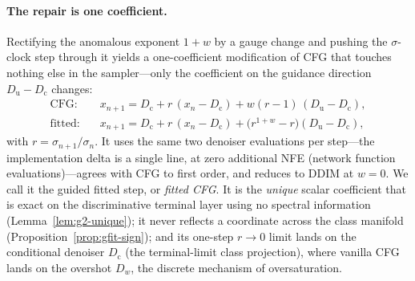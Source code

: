 \documentclass{article} %
\theoremstyle{plain}
\theoremstyle{definition}
\theoremstyle{remark}
\providecommand{\Dc}{D_{\mathrm{c}}}
\providecommand{\Du}{D_{\mathrm{u}}}
\providecommand{\Dw}{D_{w}}
\begin{document}
\paragraph{The repair is one coefficient.}
Rectifying the anomalous exponent $1+w$ by a gauge change and pushing the
$\sigma$-clock step through it yields a one-coefficient modification of CFG that
touches nothing else in the sampler---only the coefficient on the guidance
direction $\Du-\Dc$ changes:
\begin{align*}
  \text{CFG:}    \quad & x_{n+1}=\Dc+r\,(x_n-\Dc)+w(r-1)\,(\Du-\Dc),\\
  \text{fitted:} \quad & x_{n+1}=\Dc+r\,(x_n-\Dc)+\bigl(r^{1+w}-r\bigr)(\Du-\Dc),
\end{align*}
with $r=\sigma_{n+1}/\sigma_n$. It uses the same two denoiser evaluations per step---the
implementation delta is a single line, at zero additional NFE (network
function evaluations)---agrees with CFG to first order, and reduces to DDIM
at $w=0$. We call it the guided fitted step,
or \emph{fitted CFG}. It is the \emph{unique} scalar coefficient that is exact on the
discriminative terminal layer using no spectral information
(Lemma~\ref{lem:g2-unique}); it never reflects a coordinate across the class
manifold (Proposition~\ref{prop:gfit-sign}); and its one-step $r\to0$ limit
lands on the conditional denoiser $\Dc$ (the terminal-limit class projection),
where vanilla CFG lands on the overshot $\Dw$, the discrete mechanism of
oversaturation.
\end{document}

